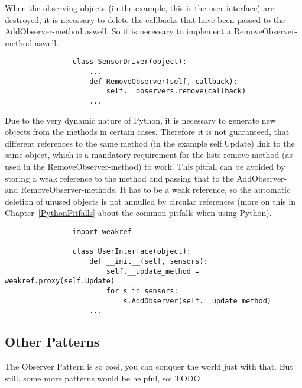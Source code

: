 			When the observing objects (in the example, this is the user interface) are destroyed, it is necessary to delete the callbacks that have been passed to the AddObserver-method aswell.
			So it is necessary to implement a RemoveObserver-method aswell.
			\begin{verbatim}
				class SensorDriver(object):
					...
					def RemoveObserver(self, callback):
						self.__observers.remove(callback)
					...
			\end{verbatim}
			Due to the very dynamic nature of Python, it is necessary to generate new objects from the methods in certain cases.
			Therefore it is not guaranteed, that different references to the same method (in the example self.Update) link to the same object, which is a mandatory requirement for the lists remove-method (as used in the RemoveObserver-method) to work.
			This pitfall can be avoided by storing a weak reference to the method and passing that to the AddObserver- and RemoveObserver-methods.
			It has to be a weak reference, so the automatic deletion of unused objects is not annulled by circular references (more on this in Chapter~\ref{PythonPitfalls} about the common pitfalls when using Python).
			\begin{verbatim}
				import weakref

				class UserInterface(object):
					def __init__(self, sensors):
						self.__update_method = weakref.proxy(self.Update)
						for s in sensors:
							s.AddObserver(self.__update_method)
					...
			\end{verbatim}


		\subsection{Other Patterns}
			The Observer Pattern is so cool, you can conquer the world just with that.
			But still, some more patterns would be helpful, so: TODO

